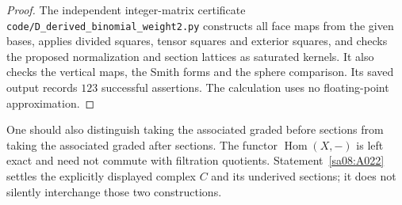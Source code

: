 \begin{proof}
The independent integer-matrix certificate
\texttt{code/D\_derived\_binomial\_weight2.py} constructs all face
maps from the given bases, applies divided squares, tensor squares
and exterior squares, and checks the proposed normalization and
section lattices as saturated kernels. It also checks the vertical
maps, the Smith forms and the sphere comparison. Its saved output
records $123$ successful assertions. The calculation uses no
floating-point approximation.
\end{proof}

One should also distinguish taking the associated graded before
sections from taking the associated graded after sections. The
functor $\operatorname{Hom}(X,-)$ is left exact and need not
commute with filtration quotients. Statement~\ref{sa08:A022}
settles the explicitly displayed complex $C$ and its underived
sections; it does not silently interchange those two constructions.
